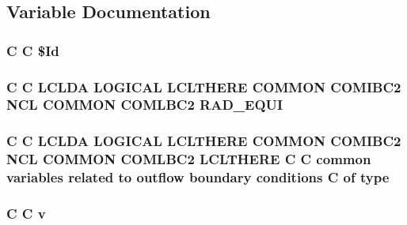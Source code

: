 \subsection{Variable Documentation}
\hypertarget{ibc2_8com_af40bd3a96fc1553c00422342f92046b8}{
\subsubsection[{\$\-Id}]{\setlength{\rightskip}{0pt plus 5cm}C C \$Id}}\label{ibc2_8com_af40bd3a96fc1553c00422342f92046b8}
\hypertarget{ibc2_8com_a5e52771773c3d7155ccec9942c9d7d87}{
\subsubsection[{R\-A\-D\-\_\-\-E\-Q\-U\-I}]{\setlength{\rightskip}{0pt plus 5cm}C C L\-C\-L\-D\-A L\-O\-G\-I\-C\-A\-L L\-C\-L\-T\-H\-E\-R\-E C\-O\-M\-M\-O\-N C\-O\-M\-I\-B\-C2 N\-C\-L C\-O\-M\-M\-O\-N C\-O\-M\-L\-B\-C2 R\-A\-D\-\_\-\-E\-Q\-U\-I}}\label{ibc2_8com_a5e52771773c3d7155ccec9942c9d7d87}
\hypertarget{ibc2_8com_a2b68f0032c5a5129886c29c634a37223}{
\subsubsection[{type}]{\setlength{\rightskip}{0pt plus 5cm}C C L\-C\-L\-D\-A L\-O\-G\-I\-C\-A\-L L\-C\-L\-T\-H\-E\-R\-E C\-O\-M\-M\-O\-N C\-O\-M\-I\-B\-C2 N\-C\-L C\-O\-M\-M\-O\-N C\-O\-M\-L\-B\-C2 L\-C\-L\-T\-H\-E\-R\-E C C common variables related to outflow boundary conditions C of type}}\label{ibc2_8com_a2b68f0032c5a5129886c29c634a37223}
\hypertarget{ibc2_8com_a8961853e9a171af64fe80e35da93a2e0}{
\subsubsection[{v}]{\setlength{\rightskip}{0pt plus 5cm}C C v}}\label{ibc2_8com_a8961853e9a171af64fe80e35da93a2e0}
